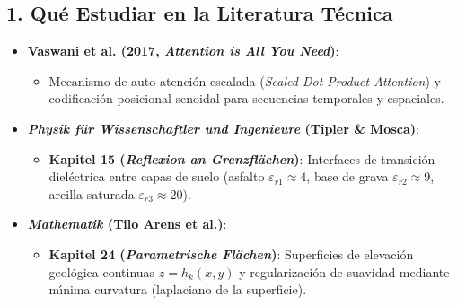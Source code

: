 \documentclass[11pt,a4paper]{article}
\begin{document}
\subsection{1. Qu{\'e} Estudiar en la Literatura T{\'e}cnica}
\begin{itemize}
    \item \textbf{Vaswani et al. (2017, \textit{Attention is All You Need})}:
    \begin{itemize}
        \item Mecanismo de auto-atenci{\'o}n escalada (\textit{Scaled Dot-Product Attention}) y codificaci{\'o}n posicional senoidal para secuencias temporales y espaciales.
    \end{itemize}
    \item \textbf{\textit{Physik f{\"u}r Wissenschaftler und Ingenieure} (Tipler \& Mosca)}:
    \begin{itemize}
        \item \textbf{Kapitel 15 (\textit{Reflexion an Grenzfl{\"a}chen})}: Interfaces de transici{\'o}n diel{\'e}ctrica entre capas de suelo (asfalto $\varepsilon_{r1} \approx 4$, base de grava $\varepsilon_{r2} \approx 9$, arcilla saturada $\varepsilon_{r3} \approx 20$).
    \end{itemize}
    \item \textbf{\textit{Mathematik} (Tilo Arens et al.)}:
    \begin{itemize}
        \item \textbf{Kapitel 24 (\textit{Parametrische Fl{\"a}chen})}: Superficies de elevaci{\'o}n geol{\'o}gica continuas $z = h_k(x, y)$ y regularizaci{\'o}n de suavidad mediante m{\'\i}nima curvatura (laplaciano de la superficie).
    \end{itemize}
\end{itemize}
\end{document}
